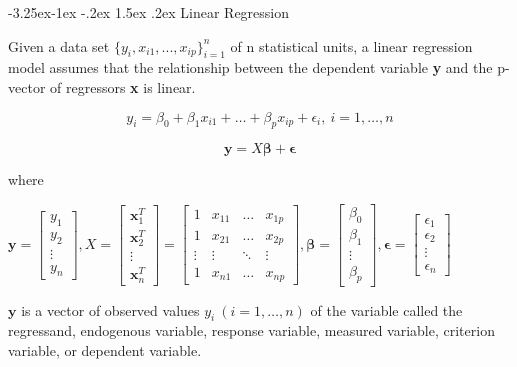\documentclass{article}
\makeatletter
\renewcommand\paragraph{\@startsection{paragraph}{4}{\z@}%
                                     {-3.25ex\@plus -1ex \@minus -.2ex}%
                                     {1.5ex \@plus .2ex}%
                                     {\normalfont\normalsize\bfseries}}
\makeatother
\begin{document}
\paragraph{Linear Regression}

Given a data set \(\{y_i, x_{i1}, ..., x_{ip}\}_{i=1}^n\) of n statistical units, a linear regression model assumes that the relationship between the dependent variable \textbf{y} and the p-vector of regressors \textbf{x} is linear.

\[y_i = \beta_0 + \beta_{1}x_{i1} + \dots + \beta_{p}x_{ip} + \epsilon_i, \: i = 1, \dots, n\]

\[\textbf{y} = X\boldsymbol{\beta} + \boldsymbol{\epsilon}\]

\noindent where

\bigskip

\(
\textbf{y} = 
\begin{bmatrix}
y_1\\
y_2\\
\vdots\\
y_n
\end{bmatrix}
,
X = 
\begin{bmatrix}
\textbf{x}_1^T\\
\textbf{x}_2^T\\
\vdots\\
\textbf{x}_n^T
\end{bmatrix} = 
\begin{bmatrix}
1 & x_{11} & \dots & x_{1p}\\
1 & x_{21} & \dots & x_{2p}\\
\vdots & \vdots & \ddots & \vdots\\
1 & x_{n1} & \dots & x_{np}
\end{bmatrix}
,
\boldsymbol{\beta} = 
\begin{bmatrix}
\beta_0\\
\beta_1\\
\vdots\\
\beta_p
\end{bmatrix}
,
\boldsymbol{\epsilon} = 
\begin{bmatrix}
\epsilon_1\\
\epsilon_2\\
\vdots\\
\epsilon_n
\end{bmatrix}
\)

\bigskip

\noindent \(\textbf{y}\) is a vector of observed values \(y_{i}\ (i=1,\ldots ,n)\) of the variable called the regressand, endogenous variable, response variable, measured variable, criterion variable, or dependent variable.
\end{document}
